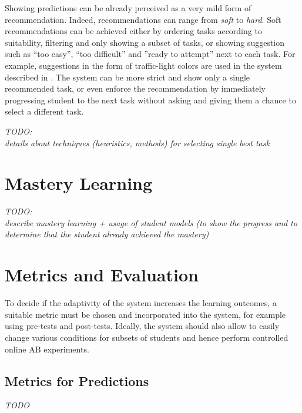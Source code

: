 Showing predictions can be already perceived as a very mild form of recommendation.
Indeed, recommendations can range from \emph{soft} to \emph{hard}.
Soft recommendations can be achieved either by
  ordering tasks according to suitability,
  filtering and only showing a subset of tasks,
  or showing suggestion such as
  ``too easy'', ``too difficult'' and ''ready to attempt'' next to each task.
For example, suggestions in the form of traffic-light colors
  are used in the system described in \cite{its-programming}.
The system can be more strict and show only a single recommended task,
  or even enforce the recommendation by immediately progressing student to
  the next task without asking and giving them a chance to select a different task.

\bigskip
\emph{TODO:\\details about techniques (heuristics, methods) for selecting single best task}

\section{Mastery Learning}
\label{sec:mastery-learning}

\emph{TODO:\\describe mastery learning + usage of student models%
(to show the progress and to determine that the student already achieved the mastery)}


\section{Metrics and Evaluation}
\label{sec:metrics-and-evaluation}

To decide if the adaptivity of the system increases the learning outcomes,
  a suitable metric must be chosen and incorporated into the system,
  for example using pre-tests and post-tests.
Ideally, the system should also allow to easily change various conditions
  for subsets of students and hence perform controlled online AB experiments.


\subsection{Metrics for Predictions}

\emph{TODO}

%


